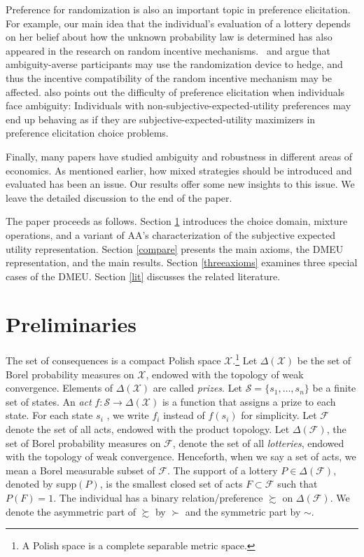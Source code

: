 \documentclass[12pt, notitlepage]{article}
\begin{document}
Preference for randomization is also an important topic in preference
elicitation. For example, our main idea that the individual's evaluation of
a lottery depends on her belief about how the unknown probability law is
determined has also appeared in the research on random incentive mechanisms. 
\cite{Bade15}\ and \cite{BaillonHalevyLi15} argue that ambiguity-averse
participants may use the randomization device to hedge, and thus the
incentive compatibility of the random incentive mechanism may be affected. 
\cite{Kuzmics17} also points out the difficulty of preference elicitation
when individuals face ambiguity: Individuals with non-subjective-expected-utility preferences may 
end up behaving as if they are subjective-expected-utility maximizers in preference elicitation
choice problems.

Finally, many papers have studied ambiguity and robustness in different
areas of economics. As mentioned earlier, how mixed strategies should be
introduced and evaluated has been an issue. Our results offer some new
insights to this issue. We leave the detailed discussion to the end of the
paper.

The paper proceeds as follows. Section \ref{mainsection} introduces the
choice domain, mixture operations, and a variant of AA's characterization of
the subjective expected utility representation. Section \ref{compare}
presents the main axioms, the DMEU representation, and the main results.
Section \ref{threeaxioms} examines three special cases of the DMEU. Section %
\ref{lit} discusses the related literature.

\section{Preliminaries}

\label{mainsection}The set of consequences is a compact Polish space $%
\mathcal{X}$.\footnote{%
A Polish space is a complete separable metric space.} Let $\Delta (\mathcal{X%
})$ be the set of Borel probability measures on $\mathcal{X}$, endowed with
the topology of weak convergence. Elements of $\Delta (\mathcal{X})$ are
called \textit{prizes}. Let $\mathcal{S}=\{s_{1},\dots ,s_{n}\}$ be a finite
set of states. An \textit{act} $f:\mathcal{S}\rightarrow \Delta (\mathcal{X}%
) $ is a function that assigns a prize to each state. For each state $s_{i}$%
, we write $f_{i}$ instead of $f(s_{i})$ for simplicity. Let $\mathcal{F}$
denote the set of all acts, endowed with the product topology. Let $\Delta (%
\mathcal{F})$, the set of Borel probability measures on $\mathcal{F}$,
denote the set of all \textit{lotteries}, endowed with the topology of weak
convergence. Henceforth, when we say a set of acts, we mean a Borel
measurable subset of $\mathcal{F}$. The support of a lottery $P\in \Delta (%
\mathcal{F})$, denoted by supp$(P)$, is the smallest closed set of acts $%
F\subset \mathcal{F}$ such that $P(F)=1$. The individual has a binary
relation/preference $\succsim $ on $\Delta (\mathcal{F})$. We denote the
asymmetric part of $\succsim $ by $\succ $ and the symmetric part by $\sim $.
\end{document}
